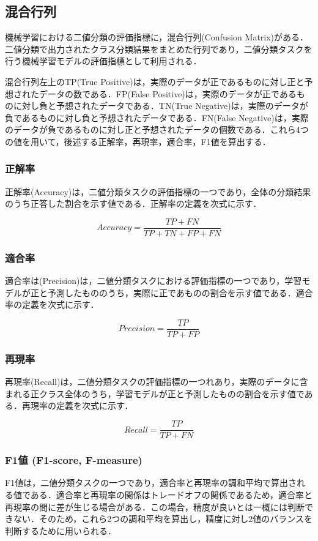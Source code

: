 \subsection{混合行列 \label{c4s2-1}}
機械学習における二値分類の評価指標に，混合行列(Confusion Matrix)がある．二値分類で出力されたクラス分類結果をまとめた行列であり，二値分類タスクを行う機械学習モデルの評価指標として利用される．
 

混合行列左上のTP(True Positive)は，実際のデータが正であるものに対し正と予想されたデータの数である．FP(False Positive)は，実際のデータが正であるものに対し負と予想されたデータである．TN(True Negative)は，実際のデータが負であるものに対し負と予想されたデータである．FN(False Negative)は，実際のデータが負であるものに対し正と予想されたデータの個数である．これら4つの値を用いて，後述する正解率，再現率，適合率，F1値を算出する．

\subsubsection{正解率 \label{c4s2-1a}}
正解率(Accuracy)は，二値分類タスクの評価指標の一つであり，全体の分類結果のうち正答した割合を示す値である．正解率の定義を次式に示す．

$$
Accuracy = \frac{TP+FN}{TP+TN+FP+FN}
$$


\subsubsection{適合率 \label{c4s2-1b}}
適合率は(Precision)は，二値分類タスクにおける評価指標の一つであり，学習モデルが正と予測したもののうち，実際に正であものの割合を示す値である．適合率の定義を次式に示す．

$$
Precision = \frac{TP}{TP+FP}
$$


\subsubsection{再現率 \label{c4s2-1c}}
再現率(Recall)は，二値分類タスクの評価指標の一つれあり，実際のデータに含まれる正クラス全体のうち，学習モデルが正と予測したものの割合を示す値である．再現率の定義を次式に示す．

$$
Recall = \frac{TP}{TP+FN}
$$

\subsubsection{F1値 (F1-score, F-measure) \label{c4s2-1d}}
F1値は，二値分類タスクの一つであり，適合率と再現率の調和平均で算出される値である．適合率と再現率の関係はトレードオフの関係であるため，適合率と再現率の間に差が生じる場合がある．この場合，精度が良いとは一概には判断できない．そのため，これら2つの調和平均を算出し，精度に対し2値のバランスを判断するために用いられる．

